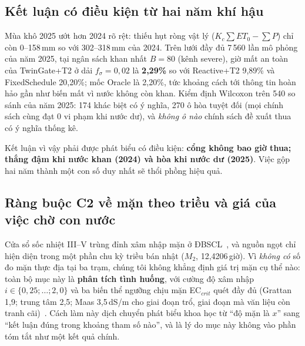 \documentclass[10pt]{article}
\begin{document}
\subsection{Kết luận có điều kiện từ hai năm khí hậu}
\label{sec:twoyears}

Mùa khô 2025 ướt hơn 2024 rõ rệt: thiếu hụt ròng vật lý ($K_c\sum ET_0 - \sum P$) chỉ còn 0--158\,mm so với 302--318\,mm của 2024. Trên lưới đầy đủ 7\,560 lần mô phỏng của năm 2025, tại ngân sách khan nhất $B{=}80$ (kênh severe), giờ mất an toàn của TwinGate+T2 ở dải $f_\sigma{=}0{,}02$ là \textbf{2,29\%} so với Reactive+T2 9,89\% và FixedSchedule 20,20\%; mốc Oracle là 2,20\%, tức khoảng cách tới thông tin hoàn hảo gần như biến mất vì nước không còn khan. Kiểm định Wilcoxon trên 540 so sánh của năm 2025: 174 khác biệt có ý nghĩa, 270 ô hòa tuyệt đối (mọi chính sách cùng đạt 0 vi phạm khi nước dư), và \emph{không ô nào} chính sách đề xuất thua có ý nghĩa thống kê.

Kết luận vì vậy phải được phát biểu có điều kiện: \textbf{cổng không bao giờ thua; thắng đậm khi nước khan (2024) và hòa khi nước dư (2025)}. Việc gộp hai năm thành một con số duy nhất sẽ thổi phồng hiệu quả.

\subsection{Ràng buộc C2 về mặn theo triều và giá của việc chờ con nước}
\label{sec:salinity}

Cửa sổ sốc nhiệt III--V trùng đỉnh xâm nhập mặn ở ĐBSCL~\cite{mard2025sal}, và nguồn ngọt chỉ hiện diện trong một phần chu kỳ triều bán nhật ($M_2$, 12,4206\,giờ). Vì \emph{không có} số đo mặn thực địa tại ba trạm, chúng tôi không khẳng định giá trị mặn cụ thể nào: toàn bộ mục này là \textbf{phân tích tình huống}, với cường độ xâm nhập $i \in \{0{,}25;\ldots;2{,}0\}$ và ba biến thể ngưỡng chịu mặn EC$_{crit}$ quét đầy đủ (Grattan 1,9; trung tâm 2,5; Maas 3,5\,dS/m cho giai đoạn trổ, giai đoạn mà văn liệu còn tranh cãi)~\cite{maas1977,usdaP572}. Cách làm này dịch chuyển phát biểu khoa học từ ``độ mặn là $x$'' sang ``kết luận đúng trong khoảng tham số nào'', và là lý do mục này không vào phần tóm tắt như một kết quả chính.

\begin{table}[t]
\centering
\caption{Tình huống xâm nhập mặn (1\,800 lần mô phỏng); severe, ngưỡng trung tâm, ba trạm. \textbf{Không có số đo thực địa}, giá trị là của mô hình tình huống.}
\label{tab:sal}
\scriptsize
\resizebox{\textwidth}{!}{}
\end{table}
\end{document}
